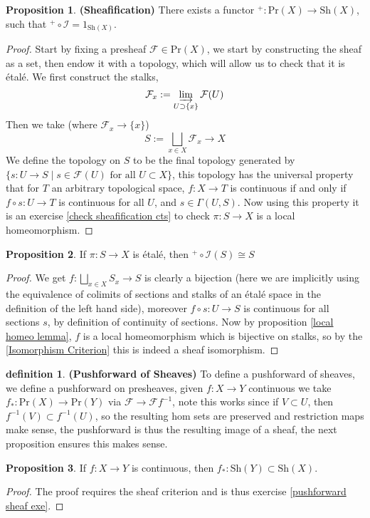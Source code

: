 \documentclass[10.5pt]{article}
\theoremstyle{definition}
\newtheorem{proposition}{Proposition}
\newtheorem{definition}{definition}
\newcommand{\set}[1]{\{#1\}}
\newcommand{\colim}{\varinjlim}
\begin{document}
    \begin{proposition}
        \textbf{(Sheafification)} There exists a functor  \(^+: \text{Pr}(X) \to \text{Sh}(X)\), such that \(^+\circ \mathcal{I} = 1_{\text{Sh}(X)}\).
    \end{proposition}
    \begin{proof}
        Start by fixing a presheaf \(\mathcal{F} \in \text{Pr}(X)\), we start by constructing the sheaf as a set, then endow it with a topology, which will allow us to check that it is \'etal\'e. We first construct the stalks, 
        \[\mathcal{F}_x := \colim_{U \supset \set{x}} \mathcal{F}(U)\]
        Then we take (where \(\mathcal{F}_x \to \set{x}\))
        \[S := \bigsqcup_{x \in X}\mathcal{F}_x \to X\]
        We define the topology on \(S\) to be the final topology generated by \(\set{s: U \to S \mid s \in \mathcal{F}(U) \text{ for all }U \subset X}\), this topology has the universal property that for \(T\) an arbitrary topological space, \(f:X \to T\) is continuous if and only if \(f \circ s: U \to T\) is continuous for all \(U\), and \(s \in \Gamma(U,S)\). Now using this property it is an exercise \ref{check sheafification cts} to check \(\pi: S \to X\) is a local homeomorphism.
    \end{proof}
    \begin{proposition}
        If \(\pi:S\to X\) is \'etal\'e, then \(^+\circ\mathcal{I}(S) \cong S\)
    \end{proposition}
    \begin{proof}
        We get \(f:\bigsqcup_{x\in X}S_x \to S\) is clearly a bijection (here we are implicitly using the equivalence of colimits of sections and stalks of an \'etal\'e space in the definition of the left hand side), moreover \(f\circ s: U \to S\) is continuous for all sections \(s\), by definition of continuity of sections. Now by proposition \ref{local homeo lemma}, \(f\) is a local homeomorphism which is bijective on stalks, so by the \ref{Isomorphism Criterion} this is indeed a sheaf isomorphism.
    \end{proof}
    \begin{definition}\textbf{(Pushforward of Sheaves)}
        To define a pushforward of sheaves, we define a pushforward on presheaves, given \(f: X \to Y\) continuous we take \(f_*: \text{Pr}(X) \to \text{Pr}(Y)\) via \(\mathcal{F} \to \mathcal{F}f^{-1}\), note this works since if \(V \subset U\), then \(f^{-1}(V) \subset f^{-1}(U)\), so the resulting hom sets are preserved and restriction maps make sense, the pushforward is thus the resulting image of a sheaf, the next proposition ensures this makes sense.
    \end{definition}
    \begin{proposition}
        If \(f: X \to Y\) is continuous, then \(f_*: \text{Sh}(Y) \subset \text{Sh}(X)\).
    \end{proposition}
    \begin{proof}
        The proof requires the sheaf criterion and is thus exercise \ref{pushforward sheaf exe}.
    \end{proof}
\end{document}
